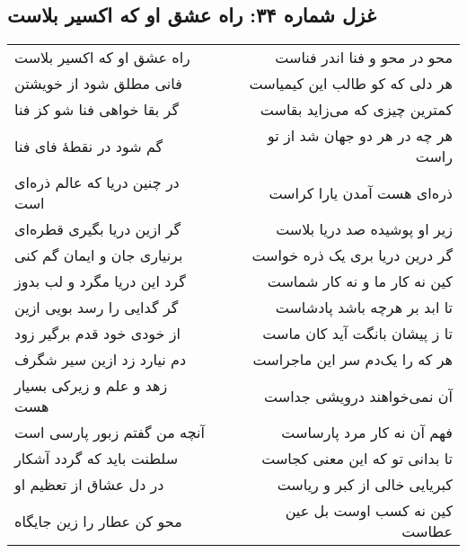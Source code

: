 \begin{center}
\section*{غزل شماره ۳۴: راه عشق او که اکسیر بلاست}
\label{sec:034}
\begin{longtable}{l p{0.5cm} r}
راه عشق او که اکسیر بلاست
&&
محو در محو و فنا اندر فناست
\\
فانی مطلق شود از خویشتن
&&
هر دلی که کو طالب این کیمیاست
\\
گر بقا خواهی فنا شو کز فنا
&&
کمترین چیزی که می‌زاید بقاست
\\
گم شود در نقطهٔ فای فنا
&&
هر چه در هر دو جهان شد از تو راست
\\
در چنین دریا که عالم ذره‌ای است
&&
ذره‌ای هست آمدن یارا کراست
\\
گر ازین دریا بگیری قطره‌ای
&&
زیر او پوشیده صد دریا بلاست
\\
برنیاری جان و ایمان گم کنی
&&
گر درین دریا بری یک ذره خواست
\\
گرد این دریا مگرد و لب بدوز
&&
کین نه کار ما و نه کار شماست
\\
گر گدایی را رسد بویی ازین
&&
تا ابد بر هرچه باشد پادشاست
\\
از خودی خود قدم برگیر زود
&&
تا ز پیشان بانگت آید کان ماست
\\
دم نیارد زد ازین سیر شگرف
&&
هر که را یک‌دم سر این ماجراست
\\
زهد و علم و زیرکی بسیار هست
&&
آن نمی‌خواهند درویشی جداست
\\
آنچه من گفتم زبور پارسی است
&&
فهم آن نه کار مرد پارساست
\\
سلطنت باید که گردد آشکار
&&
تا بدانی تو که این معنی کجاست
\\
در دل عشاق از تعظیم او
&&
کبریایی خالی از کبر و ریاست
\\
محو کن عطار را زین جایگاه
&&
کین نه کسب اوست بل عین عطاست
\\
\end{longtable}
\end{center}
